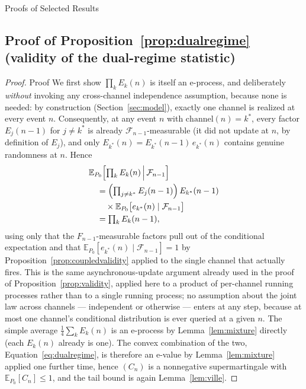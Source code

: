 \documentclass[trsc,dblanonrev]{informs4}
\newcommand{\E}{\mathbb{E}}
\newcommand{\F}{\mathcal{F}}
\begin{document}
\begin{APPENDIX}{Proofs of Selected Results}\label{app:proofs}

\subsection{Proof of Proposition~\ref{prop:dualregime} (validity of the dual-regime statistic)}

\begin{proof}{Proof}
We first show $\prod_k E_k(n)$ is itself an e-process, and deliberately
\emph{without} invoking any cross-channel independence assumption,
because none is needed: by construction (Section~\ref{sec:model}),
exactly one channel is realized at every event $n$. Consequently, at
any event $n$ with $\mathrm{channel}(n) = k^\ast$, every factor
$E_j(n-1)$ for $j \ne k^\ast$ is already $\F_{n-1}$-measurable (it did
not update at $n$, by definition of $E_j$), and only $E_{k^\ast}(n) =
E_{k^\ast}(n-1)\, e_{k^\ast}(n)$ contains genuine randomness at $n$.
Hence
\begin{align*}
&\E_{P_0}\Bigl[\textstyle\prod\nolimits_k E_k(n) \,\Big|\, \F_{n-1}\Bigr] \\
&\quad= \Bigl(\textstyle\prod\nolimits_{j \ne k^\ast} E_j(n-1)\Bigr)\,
E_{k^\ast}(n-1) \\
&\qquad {}\times \E_{P_0}\bigl[e_{k^\ast}(n) \mid \F_{n-1}\bigr] \\
&\quad= \textstyle\prod\nolimits_k E_k(n-1),
\end{align*}
using only that the $F_{n-1}$-measurable factors pull out of the
conditional expectation and that $\E_{P_0}[e_{k^\ast}(n) \mid \F_{n-1}]
= 1$ by Proposition~\ref{prop:coupledvalidity} applied to the single
channel that actually fires. This is the same asynchronous-update
argument already used in the proof of
Proposition~\ref{prop:validity}, applied here to a product of
per-channel running processes rather than to a single running process;
no assumption about the joint law across channels --- independent or
otherwise --- enters at any step, because at most one channel's
conditional distribution is ever queried at a given $n$. The simple
average $\tfrac{1}{4}\sum_k E_k(n)$ is an e-process by
Lemma~\ref{lem:mixture} directly (each $E_k(n)$ already is one). The
convex combination of the two, Equation~\eqref{eq:dualregime}, is
therefore an e-value by Lemma~\ref{lem:mixture} applied one further
time, hence $(C_n)$ is a nonnegative supermartingale with
$\E_{P_0}[C_n] \le 1$, and the tail bound is again Lemma~\ref{lem:ville}.
\Halmos
\end{proof}


\end{APPENDIX}
\end{document}
